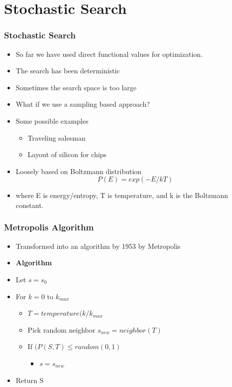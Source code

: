\documentclass[10pt]{beamer}
\newcommand{\myemph}[1]{{\usebeamercolor[fg]{emphprimary}
    \textbf{#1}}}
\begin{document}
\section{Stochastic Search}
\label{sec:stochastic-search}

\begin{frame}
  \frametitle{Stochastic Search}
  \begin{itemize}
  \item So far we have used direct functional values for optimization. 
  \item The search has been deterministic 
  \item Sometimes the search space is too large
  \item What if we use a sampling based approach?
  \item Some possible examples
    \begin{itemize}
    \item Traveling salesman
    \item Layout of silicon for chips
    \end{itemize}
  \item Loosely based on Boltzmann distribution
    \[
      P(E) = exp(-E/kT)
    \]
  \item where E is energy/entropy, T is temperature, and k is the
    Boltzmann constant.
    
  \end{itemize}
\end{frame}

\begin{frame}
  \frametitle{Metropolis Algorithm}
  \begin{itemize}
  \item Transformed into an algorithm by 1953 by Metropolis
  \item \myemph{Algorithm}
  \item Let $s= s_0$
  \item For $k=0 \mbox{ to } k_{max}$
    \begin{itemize}
    \item $T = temperature (k/k_{max}$
    \item Pick random neighbor $s_{new} = neighbor(T)$
    \item If $(P(S,T) \leq random(0,1)$
      \begin{itemize}
      \item $s = s_{new}$        
      \end{itemize}
    \end{itemize}
  \item Return S
  \end{itemize}
\end{frame}
\end{document}
